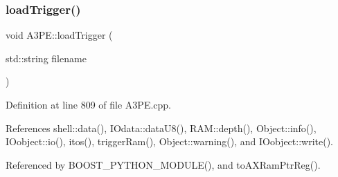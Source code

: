 \subsubsection{\texorpdfstring{load\+Trigger()}{loadTrigger()}}
{\footnotesize\ttfamily void A3\+P\+E\+::load\+Trigger (\begin{DoxyParamCaption}\item[{std\+::string}]{filename }\end{DoxyParamCaption})}



Definition at line 809 of file A3\+P\+E.\+cpp.



References shell\+::data(), I\+Odata\+::data\+U8(), R\+A\+M\+::depth(), Object\+::info(), I\+Oobject\+::io(), itos(), trigger\+Ram(), Object\+::warning(), and I\+Oobject\+::write().



Referenced by B\+O\+O\+S\+T\+\_\+\+P\+Y\+T\+H\+O\+N\+\_\+\+M\+O\+D\+U\+L\+E(), and to\+A\+X\+Ram\+Ptr\+Reg().


